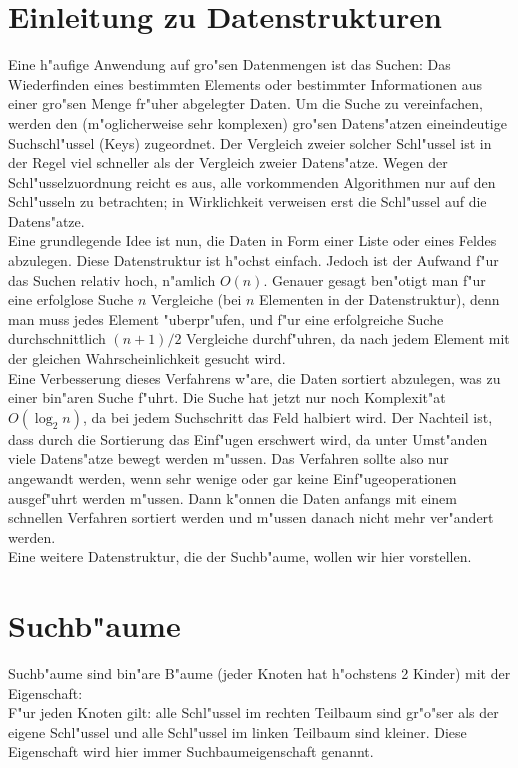 \documentclass[a4paper,titlepage]{article}
\begin{document}
\begin{appendix}


\section{Einleitung zu Datenstrukturen}
Eine h"aufige Anwendung auf gro"sen Datenmengen ist das Suchen:
Das Wiederfinden eines bestimmten Elements oder bestimmter
Informationen aus einer gro"sen Menge fr"uher abgelegter Daten. Um
die Suche zu vereinfachen, werden den (m"oglicherweise sehr
komplexen) gro"sen Datens"atzen eineindeutige Suchschl"ussel (Keys)
zugeordnet. Der Vergleich zweier solcher Schl"ussel ist in der
Regel viel schneller als der Vergleich zweier Datens"atze. Wegen
der Schl"usselzuordnung reicht es aus, alle vorkommenden
Algorithmen nur auf den Schl"usseln zu betrachten; in Wirklichkeit
verweisen erst die Schl"ussel auf die Datens"atze. \\ 
Eine grundlegende Idee ist nun, die Daten in Form einer Liste oder
eines Feldes abzulegen. Diese Datenstruktur ist h"ochst einfach.
Jedoch ist der Aufwand f"ur das Suchen relativ hoch, n"amlich
$O(n)$. Genauer gesagt ben"otigt man f"ur eine erfolglose Suche $n$
Vergleiche (bei $n$ Elementen in der Datenstruktur), 
denn man muss jedes Element "uberpr"ufen, und f"ur
eine erfolgreiche Suche durchschnittlich $(n+1)/2$ Vergleiche
durchf"uhren, da
nach jedem Element mit der gleichen Wahrscheinlichkeit gesucht
wird. \\
Eine Verbesserung dieses Verfahrens w"are, die Daten
sortiert abzulegen, was zu einer bin"aren Suche f"uhrt. Die
Suche hat jetzt nur noch Komplexit"at $O(\log_2{n})$, da bei jedem
Suchschritt das Feld halbiert wird. Der Nachteil ist, dass durch
die Sortierung das Einf"ugen erschwert wird, da unter Umst"anden
viele Datens"atze bewegt werden m"ussen. Das Verfahren sollte also
nur angewandt werden, wenn sehr wenige oder gar keine
Einf"ugeoperationen ausgef"uhrt werden m"ussen. Dann k"onnen die
Daten anfangs mit einem schnellen Verfahren sortiert werden und
m"ussen danach nicht mehr ver"andert werden. \\
Eine weitere Datenstruktur, die der Suchb"aume, wollen wir hier
vorstellen.





\section{\label{A}Suchb"aume}
Suchb"aume sind bin"are B"aume (jeder Knoten hat h"ochstens 2
Kinder) mit der Eigenschaft: \\ F"ur jeden Knoten gilt: alle
Schl"ussel im rechten Teilbaum sind gr"o"ser als der eigene
Schl"ussel und alle Schl"ussel im linken Teilbaum sind kleiner.
Diese Eigenschaft wird hier immer Suchbaumeigenschaft genannt. 


\end{appendix}
\end{document}
